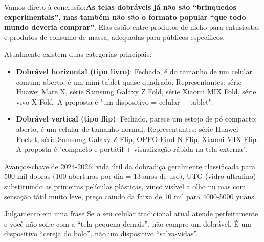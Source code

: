


Vamos direto à conclusão:\textbf{As telas dobráveis já não são “brinquedos experimentais”, mas também não são o formato popular “que todo mundo deveria comprar”}. Elas estão entre produtos de nicho para entusiastas e produtos de consumo de massa, adequadas para públicos específicos.

Atualmente existem duas categorias principais:

\begin{itemize}
  \item \textbf{Dobrável horizontal (tipo livro)}: Fechado, é do tamanho de um celular comum; aberto, é um mini tablet quase quadrado. Representantes: série Huawei Mate X, série Samsung Galaxy Z Fold, série Xiaomi MIX Fold, série vivo X Fold. A proposta é "um dispositivo = celular + tablet".
  \item \textbf{Dobrável vertical (tipo flip)}: Fechado, parece um estojo de pó compacto; aberto, é um celular de tamanho normal. Representantes: série Huawei Pocket, série Samsung Galaxy Z Flip, OPPO Find N Flip, Xiaomi MIX Flip. A proposta é "compacto e portátil + visualização rápida na tela externa".
\end{itemize}

Avanços-chave de 2024-2026: vida útil da dobradiça geralmente classificada para 500 mil dobras (100 aberturas por dia = 13 anos de uso), UTG (vidro ultrafino) substituindo as primeiras películas plásticas, vinco visível a olho nu mas com sensação tátil muito leve, preço caindo da faixa de 10 mil para 4000-5000 yuans.

\begin{tcbinfo}{Julgamento em uma frase}
Se o seu celular tradicional atual atende perfeitamente e você não sofre com a “tela pequena demais”, não compre um dobrável. É um dispositivo “cereja do bolo”, não um dispositivo “salva-vidas”.

\end{tcbinfo}

